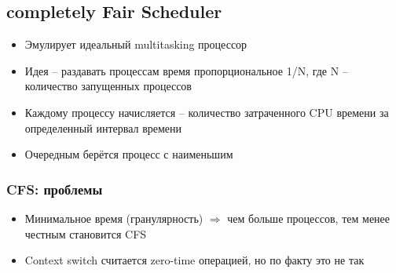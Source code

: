   \subsection{completely Fair Scheduler}
    \begin{itemize}
      \item Эмулирует идеальный multitasking процессор
      \item Идея -- раздавать процессам время пропорциональное 1/N, где N -- количество запущенных процессов
      \item Каждому процессу начисляется  -- количество затраченного CPU времени за определенный интервал времени
      \item Очередным берётся процесс с наименьшим 
    \end{itemize}
  
  \subsubsection{CFS: проблемы}
    \begin{itemize}
      \item Минимальное время (гранулярность) $\Rightarrow$ чем больше процессов, тем менее честным становится CFS
      \item Context switch считается zero-time операцией, но по факту это не так
    \end{itemize}

